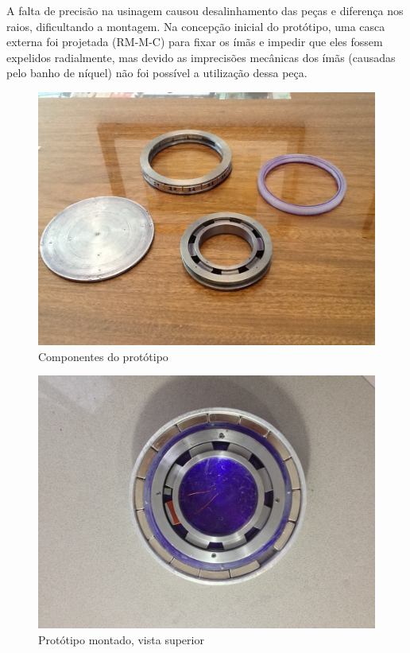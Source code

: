 A falta de precisão na usinagem causou desalinhamento das peças e diferença nos raios, dificultando a montagem. Na concepção inicial do protótipo, uma casca externa foi projetada (RM-M-C) para fixar os ímãs e impedir que eles fossem expelidos radialmente, mas devido as imprecisões mecânicas dos ímãs (causadas pelo banho de níquel) não foi possível a utilização dessa peça. 


\begin{figure}[ht!]
\centering
\includegraphics[width=0.8\linewidth]{Figs/img/partes}
\caption{Componentes do protótipo}
\label{fig:partes}
\end{figure}


\begin{figure}[ht!]
\centering
\includegraphics[width=0.8\linewidth]{Figs/img/completo}
\caption{Protótipo montado, vista superior}
\label{fig:completo}
\end{figure}



